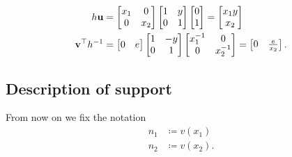 \begin{align*}
  h \mathbf u &=
    \begin{bmatrix} x_1 & 0 \\ 0 & x_2 \end{bmatrix}
    \begin{bmatrix} 1 & y \\ 0 & 1 \end{bmatrix}
    \begin{bmatrix} 0 \\ 1 \end{bmatrix}
    = \begin{bmatrix} x_1 y \\ x_2 \end{bmatrix} \\
  \mathbf v^\top h^{-1} &=
    \begin{bmatrix} 0 & e \end{bmatrix}
    \begin{bmatrix} 1 & -y \\ 0 & 1 \end{bmatrix}
    \begin{bmatrix} x_1^{-1} & 0 \\ 0 & x_2^{-1} \end{bmatrix}
    = \begin{bmatrix} 0 & \frac{e}{x_2} \end{bmatrix}.
\end{align*}

\subsection{Description of support}
From now on we fix the notation
\begin{align*}
  n_1 &\coloneqq v(x_1) \\
  n_2 &\coloneqq v(x_2).
\end{align*}

